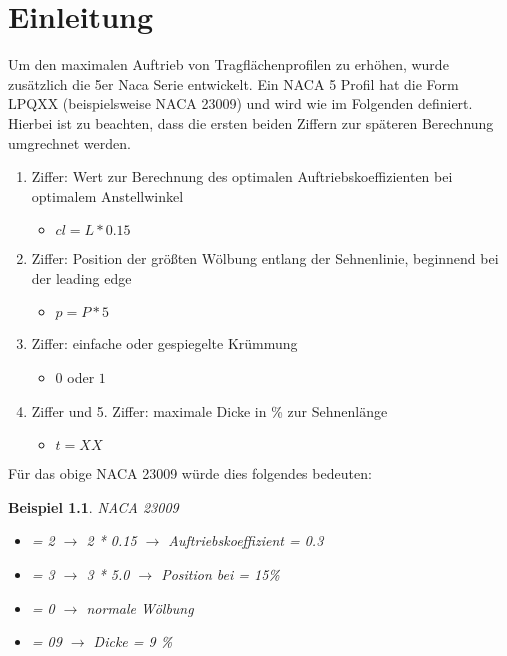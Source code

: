 \documentclass[12pt]{scrreprt}
\newtheorem{bsp}{Beispiel}[chapter]
\begin{document}
\chapter{Einleitung}

Um den maximalen Auftrieb von Tragfl\"achenprofilen zu erh\"ohen, wurde zus\"atzlich die 5er Naca Serie entwickelt. Ein NACA 5 Profil hat die Form LPQXX (beispielsweise NACA 23009) und wird wie im Folgenden definiert. Hierbei ist zu beachten, dass die ersten beiden Ziffern zur sp\"ateren Berechnung umgrechnet werden.

\begin{enumerate}
	\item Ziffer: Wert zur Berechnung des optimalen Auftriebskoeffizienten bei optimalem Anstellwinkel
		\begin{itemize}
			\item $cl = L * 0.15 $
		\end{itemize}	
	\item Ziffer: Position der gr\"o\ss ten W\"olbung entlang der Sehnenlinie, beginnend bei der leading edge
		\begin{itemize}
			\item $p = P * 5 $
		\end{itemize}
	\item Ziffer: einfache oder gespiegelte Kr\"ummung
		\begin{itemize}
			\item $0$ oder $1$
		\end{itemize}
	\item Ziffer und 5. Ziffer: maximale Dicke in \% zur Sehnenl\"ange
		\begin{itemize}
			\item $t = XX$
		\end{itemize}	
\end{enumerate}

\noindent F\"ur das obige NACA 23009 w\"urde dies folgendes bedeuten: 

\begin{bsp}
NACA 23009
\begin{itemize}
	\item[L] = 2 $\rightarrow$ 2 * 0.15 $\rightarrow$  Auftriebskoeffizient = 0.3
	\item[P] = 3 $\rightarrow$ 3 * 5.0 $\rightarrow$  Position bei = 15\%
	\item[Q] = 0 $\rightarrow$ normale W\"olbung
	\item[XX] = 09 $\rightarrow$ Dicke = 9 \%
\end{itemize}
\end{bsp}
\end{document}
